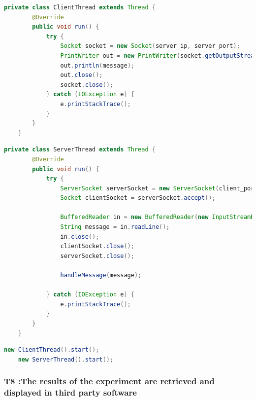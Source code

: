 \vspace{0.5cm}

\begin{lstlisting}[language=java,label=t7b,lineskip={0pt}, caption=T7: Server Code, basicstyle=\scriptsize, captionpos=b]
    private class ClientThread extends Thread {
        @Override
        public void run() {
            try {
                Socket socket = new Socket(server_ip, server_port);
                PrintWriter out = new PrintWriter(socket.getOutputStream(), true);
                out.println(message);
                out.close();
                socket.close();
            } catch (IOException e) {
                e.printStackTrace();
            }
        }
    }
\end{lstlisting}

\begin{lstlisting}[language=java,label=t7a,lineskip={0pt}, caption=T7: Client Code, basicstyle=\scriptsize, captionpos=b]
private class ServerThread extends Thread {
        @Override
        public void run() {
            try {
                ServerSocket serverSocket = new ServerSocket(client_port);
                Socket clientSocket = serverSocket.accept();

                BufferedReader in = new BufferedReader(new InputStreamReader(clientSocket.getInputStream()));
                String message = in.readLine();
                in.close();
                clientSocket.close();
                serverSocket.close();

                handleMessage(message);

            } catch (IOException e) {
                e.printStackTrace();
            }
        }
    }
\end{lstlisting}

\begin{lstlisting}[language=java,label=t7c,lineskip={0pt}, caption=T7: Starting Server and Client Threads, basicstyle=\scriptsize, captionpos=b]
    new ClientThread().start();
    new ServerThread().start();
\end{lstlisting}

\newpage

\subsubsection*{T8 :The results of the experiment are retrieved and displayed in third party software}

